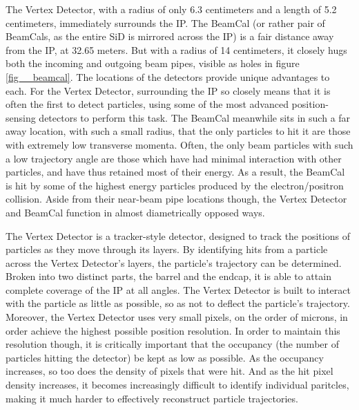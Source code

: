 \documentclass{report}
\begin{document}
                The Vertex Detector, with a radius of only 6.3 centimeters and a length of 5.2 centimeters, immediately surrounds the IP. The BeamCal (or rather pair of BeamCals, as the entire SiD is mirrored across the IP) is a fair distance away from the IP, at 32.65 meters. But with a radius of 14 centimeters, it closely hugs both the incoming and outgoing beam pipes, visible as holes in figure \ref{fig__beamcal}. The locations of the detectors provide unique advantages to each. For the Vertex Detector, surrounding the IP so closely means that it is often the first to detect particles, using some of the most advanced position-sensing detectors to perform this task. The BeamCal meanwhile sits in such a far away location, with such a small radius, that the only particles to hit it are those with extremely low transverse momenta. Often, the only beam particles with such a low trajectory angle are those which have had minimal interaction with other particles, and have thus retained most of their energy. As a result, the BeamCal is hit by some of the highest energy particles produced by the electron/positron collision. Aside from their near-beam pipe locations though, the Vertex Detector and BeamCal function in almost diametrically opposed ways.

                The Vertex Detector is a tracker-style detector, designed to track the positions of particles as they move through its layers. By identifying hits from a particle across the Vertex Detector's layers, the particle's trajectory can be determined. Broken into two distinct parts, the barrel and the endcap, it is able to attain complete coverage of the IP at all angles. The Vertex Detector is built to interact with the particle as little as possible, so as not to deflect the particle's trajectory. Moreover, the Vertex Detector uses very small pixels, on the order of microns, in order achieve the highest possible position resolution. In order to maintain this resolution though, it is critically important that the occupancy (the number of particles hitting the detector) be kept as low as possible. As the occupancy increases, so too does the density of pixels that were hit. And as the hit pixel density increases, it becomes increasingly difficult to identify individual paritcles, making it much harder to effectively reconstruct particle trajectories.
                
\end{document}
